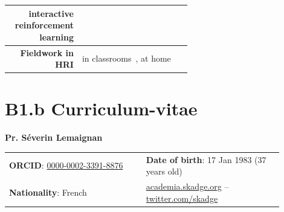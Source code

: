 \documentclass[11pt,a4paper]{report}
\newcommand{\eu}[1]{}
\begin{document}
\begin{table}[h]
\begin{tabular}{rp{0.6\linewidth}}
        interactive reinforcement learning & \small \cite{senft2017leveraging,senft2017supervised, senft2019teaching} \\
        \midrule
        \textbf{Fieldwork in HRI} & \small in
        classrooms~\cite{hood2015when, lemaignan2016learning, jacq2016building,
        baxter2015wider,kennedy2016cautious,senft2018robots}, at home~\cite{mondada2015ranger}\\
        \bottomrule
    \end{tabular}
    \label{pi-expertise}
\end{table}



\newpage

\printbibliography





\newpage

\chapter{B1.b Curriculum-vitae}\label{the-principal-investigator}


{\LARGE \bf Pr. Séverin Lemaignan}

\vspace{2em}

\begin{tabular}{p{0.45\linewidth}p{0.45\linewidth}}
    \textbf{ORCID}:
    \href{http://orcid.org/0000-0002-3391-8876}{0000-0002-3391-8876} & \textbf{Date of birth}: 17 Jan 1983 (37 years old) \\
\textbf{Nationality}: French & \href{https://academia.skadge.org}{academia.skadge.org} -- \href{https://twitter.com/skadge}{twitter.com/skadge}
\end{tabular}
\end{document}
